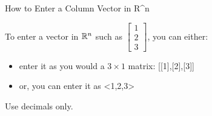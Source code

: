\begin{edXshowhide}{How to Enter a Column Vector in R^n}

To enter a vector in $\mathbb R^n$ such as $\left[\begin{array}{c} 1 \\ 2  \\ 3 \end{array} \right]$, you can either:
\begin{itemize}
\item
enter it as 
you would a $3\times 1$ matrix: [[1],[2],[3]]  
\item
or, you can enter it as <1,2,3>
\end{itemize}

Use decimals only.  

\end{edXshowhide}


